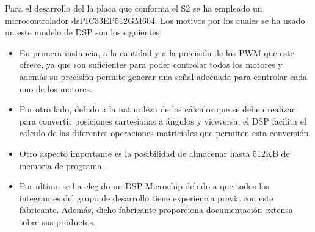Para el desarrollo del la placa que conforma el S2 se ha empleado un microcontrolador dsPIC33EP512GM604.
Los motivos por los cuales se ha usado un este modelo de DSP son los siguientes: 

\begin{itemize}
\item En primera instancia, a la cantidad y a la precisión de los PWM que este ofrece, ya que son suficientes para poder controlar todos los motores y además su precisión permite generar una señal adecuada para controlar cada uno de los motores.

\item Por otro lado, debido a la naturaleza de los cálculos que se deben realizar para convertir posiciones cartesianas a ángulos y viceversa, el DSP facilita el calculo de las diferentes operaciones matriciales que permiten esta conversión.

\item Otro aspecto importante es la posibilidad de almacenar hasta 512KB de memoria de programa.

\item Por ultimo se ha elegido un DSP Microchip debido a que todos los integrantes del grupo de desarrollo tiene experiencia previa con este fabricante. Además, dicho fabricante proporciona documentación extensa sobre sus productos.

\end{itemize}




    
